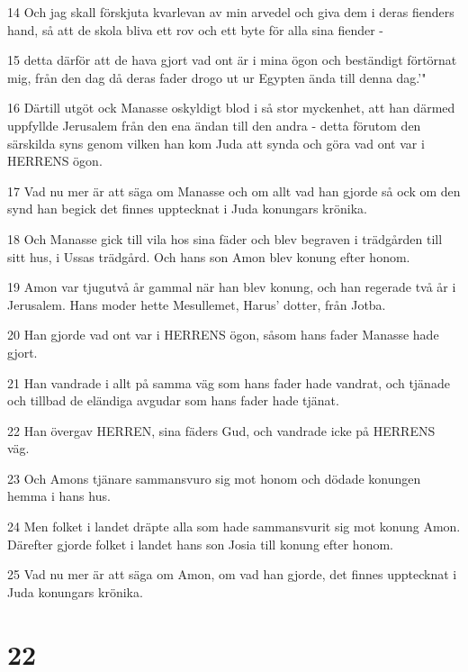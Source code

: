\par 14 Och jag skall förskjuta kvarlevan av min arvedel och giva dem i deras fienders hand, så att de skola bliva ett rov och ett byte för alla sina fiender -
\par 15 detta därför att de hava gjort vad ont är i mina ögon och beständigt förtörnat mig, från den dag då deras fader drogo ut ur Egypten ända till denna dag.'"
\par 16 Därtill utgöt ock Manasse oskyldigt blod i så stor myckenhet, att han därmed uppfyllde Jerusalem från den ena ändan till den andra - detta förutom den särskilda syns genom vilken han kom Juda att synda och göra vad ont var i HERRENS ögon.
\par 17 Vad nu mer är att säga om Manasse och om allt vad han gjorde så ock om den synd han begick det finnes upptecknat i Juda konungars krönika.
\par 18 Och Manasse gick till vila hos sina fäder och blev begraven i trädgården till sitt hus, i Ussas trädgård. Och hans son Amon blev konung efter honom.
\par 19 Amon var tjugutvå år gammal när han blev konung, och han regerade två år i Jerusalem. Hans moder hette Mesullemet, Harus' dotter, från Jotba.
\par 20 Han gjorde vad ont var i HERRENS ögon, såsom hans fader Manasse hade gjort.
\par 21 Han vandrade i allt på samma väg som hans fader hade vandrat, och tjänade och tillbad de eländiga avgudar som hans fader hade tjänat.
\par 22 Han övergav HERREN, sina fäders Gud, och vandrade icke på HERRENS väg.
\par 23 Och Amons tjänare sammansvuro sig mot honom och dödade konungen hemma i hans hus.
\par 24 Men folket i landet dräpte alla som hade sammansvurit sig mot konung Amon. Därefter gjorde folket i landet hans son Josia till konung efter honom.
\par 25 Vad nu mer är att säga om Amon, om vad han gjorde, det finnes upptecknat i Juda konungars krönika.

\chapter{22}

